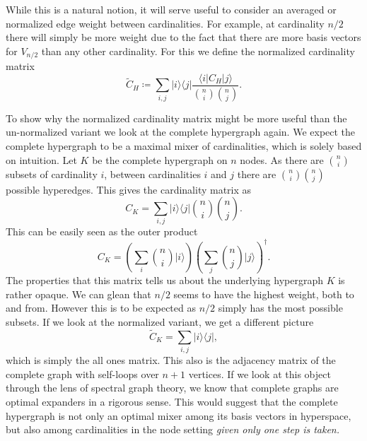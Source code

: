 \documentclass{article}
\newcommand{\ket}[1]{|#1\rangle}
\newcommand{\bra}[1]{\langle #1|}
\newcommand{\ketbra}[2]{| #1\rangle\! \langle #2|}
\newcommand{\parens}[1]{\left( #1 \right)}
\begin{document}
While this is a natural notion, it will serve useful to consider an averaged or normalized edge weight between cardinalities. For example, at cardinality $n/2$ there will simply be more weight due to the fact that there are more basis vectors for $V_{n/2}$ than any other cardinality. For this we define the normalized cardinality matrix
\begin{equation}
    \widetilde{C}_H \coloneqq \sum_{i,j} \ketbra{i}{j} \frac{\bra{i} C_H \ket{j}}{\binom{n}{i} \binom{n}{j}}.
\end{equation}

To show why the normalized cardinality matrix might be more useful than the un-normalized variant we look at the complete hypergraph again. We expect the complete hypergraph to be a maximal mixer of cardinalities, which is solely based on intuition. Let $K$ be the complete hypergraph on $n$ nodes. As there are $\binom{n}{i}$ subsets of cardinality $i$, between cardinalities $i$ and $j$ there are $\binom{n}{i} \binom{n}{j}$ possible hyperedges. This gives the cardinality matrix as
\begin{equation}
    C_K = \sum_{i,j} \ketbra{i}{j} \binom{n}{i} \binom{n}{j}.
\end{equation}
This can be easily seen as the outer product
\begin{equation}
    C_K = \parens{\sum_{i} \binom{n}{i} \ket{i}} \parens{\sum_{j} \binom{n}{j} \ket{j}}^\dagger.
\end{equation}
The properties that this matrix tells us about the underlying hypergraph $K$ is rather opaque. We can glean that $n/2$ seems to have the highest weight, both to and from. However this is to be expected as $n/2$ simply has the most possible subsets. If we look at the normalized variant, we get a different picture
\begin{equation}
    \widetilde{C}_K = \sum_{i,j} \ketbra{i}{j},
\end{equation}
which is simply the all ones matrix. This also is the adjacency matrix of the complete graph with self-loops over $n+1$ vertices. If we look at this object through the lens of spectral graph theory, we know that complete graphs are optimal expanders in a rigorous sense. This would suggest that the complete hypergraph is not only an optimal mixer among its basis vectors in hyperspace, but also among cardinalities in the node setting \emph{given only one step is taken.}
\end{document}
